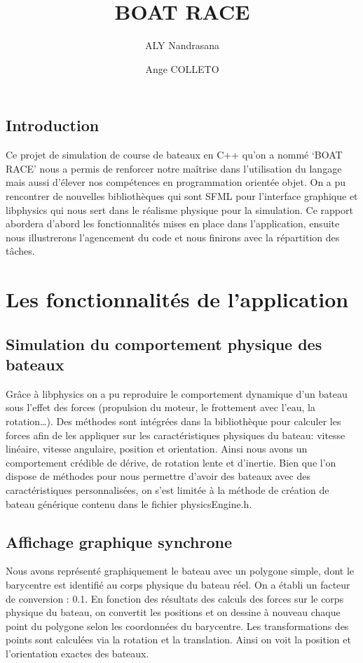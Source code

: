 \documentclass[a4paper,margin=1cm,11pt]{report}
\title{\Huge BOAT RACE}
\author{ALY Nandrasana \and Ange COLLETO}
\begin{document}
\maketitle

\tableofcontents
\newpage
\section*{Introduction}
Ce projet de simulation de course de bateaux en C++ qu’on a nommé ‘BOAT RACE’ nous a permis de renforcer notre maîtrise dans l’utilisation du langage mais aussi d'élever nos compétences en programmation orientée objet. On a pu rencontrer de nouvelles bibliothèques qui sont SFML pour l’interface graphique et libphysics qui nous sert dans le réalisme physique pour la simulation. 
Ce rapport abordera d’abord les fonctionnalités mises en place dans l’application, ensuite nous illustrerons l’agencement du code et nous finirons avec la répartition des tâches.

\chapter{Les fonctionnalités de l'application}
\section{Simulation du comportement physique des bateaux}

Grâce à libphysics on a pu reproduire le comportement dynamique d’un bateau sous l’effet des forces (propulsion du moteur, le frottement avec l’eau, la rotation…).
Des méthodes sont intégrées dans la bibliothèque pour calculer les forces afin de les appliquer sur les caractéristiques physiques du bateau: vitesse linéaire, vitesse angulaire, position et orientation. 
Ainsi nous avons un comportement crédible de dérive, de rotation lente et d’inertie.
Bien que l’on dispose de méthodes pour nous permettre d’avoir des bateaux avec des caractéristiques personnalisées, on s’est limitée à la méthode de création de bateau générique contenu dans le fichier physicsEngine.h.

\section{Affichage graphique synchrone}
Nous avons représenté graphiquement le bateau avec un polygone simple, dont le barycentre est identifié au corps physique du bateau réel.
On a établi un facteur de conversion : 0.1.
En fonction des résultats des calculs des forces sur le corps physique du bateau, on convertit les positions et on dessine à nouveau chaque point du polygone selon les coordonnées du barycentre. Les transformations des points sont calculées via la rotation et la translation.
Ainsi on voit la position et l’orientation exactes des bateaux.
\end{document}
